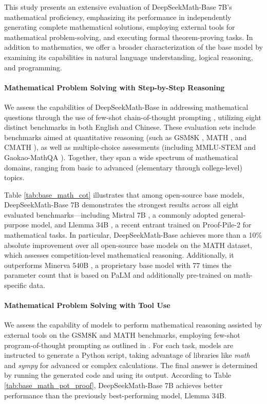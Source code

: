 \begin{itemize}[topsep=0pt]
This study presents an extensive evaluation of DeepSeekMath-Base 7B’s mathematical proficiency, emphasizing its performance in independently generating complete mathematical solutions, employing external tools for mathematical problem-solving, and executing formal theorem-proving tasks. In addition to mathematics, we offer a broader characterization of the base model by examining its capabilities in natural language understanding, logical reasoning, and programming.

\paragraph{Mathematical Problem Solving with Step-by-Step Reasoning}

We assess the capabilities of DeepSeekMath-Base in addressing mathematical questions through the use of few-shot chain-of-thought prompting \citep{cot}, utilizing eight distinct benchmarks in both English and Chinese. These evaluation sets include benchmarks aimed at quantitative reasoning (such as GSM8K \citep{gsm8k}, MATH \citep{MATH}, and CMATH \citep{wei2023cmath}), as well as multiple-choice assessments (including MMLU-STEM \citep{mmlu} and Gaokao-MathQA \citep{agieval}). Together, they span a wide spectrum of mathematical domains, ranging from basic to advanced (elementary through college-level) topics.

Table \ref{tab:base_math_cot} illustrates that among open-source base models, DeepSeekMath-Base 7B demonstrates the strongest results across all eight evaluated benchmarks—including Mistral 7B \citep{mistral}, a commonly adopted general-purpose model, and Llemma 34B \citep{llemma}, a recent entrant trained on Proof-Pile-2 \citep{llemma} for mathematical tasks. In particular, DeepSeekMath-Base achieves more than a 10\% absolute improvement over all open-source base models on the MATH dataset, which assesses competition-level mathematical reasoning. Additionally, it outperforms Minerva 540B \citep{minerva}, a proprietary base model with 77 times the parameter count that is based on PaLM \citep{palm} and additionally pre-trained on math-specific data.

\paragraph{Mathematical Problem Solving with Tool Use} We assess the capability of models to perform mathematical reasoning assisted by external tools on the GSM8K and MATH benchmarks, employing few-shot program-of-thought prompting as outlined in \citep{pot,pal}. For each task, models are instructed to generate a Python script, taking advantage of libraries like \textit{math} and \textit{sympy} for advanced or complex calculations. The final answer is determined by running the generated code and using its output. According to Table \ref{tab:base_math_pot_proof}, DeepSeekMath-Base 7B achieves better performance than the previously best-performing model, Llemma 34B.


\end{itemize}
